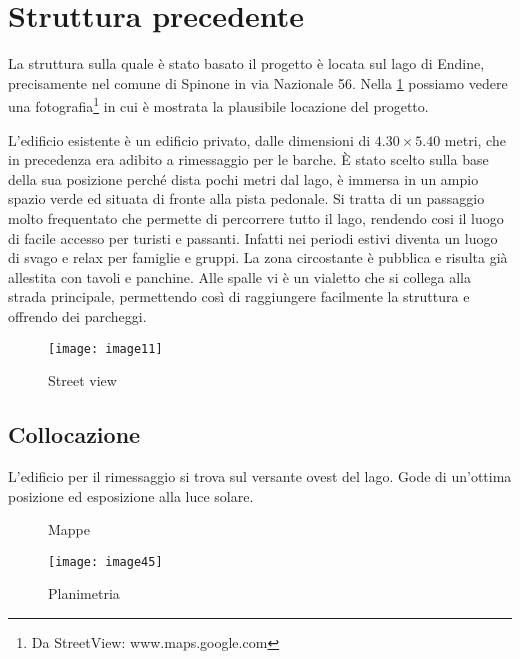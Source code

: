 \section{Struttura precedente}

La struttura sulla quale è stato basato il progetto è locata sul lago di Endine,  precisamente nel comune di Spinone in via Nazionale 56. Nella \cref{fig:streetview} possiamo vedere una fotografia\footnote{Da StreetView: www.maps.google.com} in cui è mostrata la plausibile locazione del progetto.

L'edificio esistente è un edificio privato, dalle dimensioni di $4.30 \times 5.40$ metri, che in precedenza era adibito a rimessaggio per le barche.  È stato scelto sulla base della sua posizione perché dista pochi metri dal lago, è immersa in un ampio spazio verde  ed situata di fronte alla pista pedonale. Si tratta di un passaggio molto frequentato  che permette di percorrere tutto il lago, rendendo cosi il luogo di facile accesso per turisti e passanti. Infatti nei periodi estivi diventa un luogo di svago e relax per famiglie e gruppi. La zona circostante è pubblica e risulta già allestita con tavoli e panchine. Alle spalle vi è un vialetto  che si collega alla strada principale, permettendo così di raggiungere facilmente la struttura e offrendo dei parcheggi.

\begin{figure}[H]
	\centering
	\texttt{[image: image11]}
	\caption{Street view}
	\label{fig:streetview}
\end{figure}

\clearpage
\subsection{Collocazione}

L'edificio per il rimessaggio si trova sul versante ovest del lago. Gode di un'ottima posizione ed esposizione alla luce solare.

\begin{figure}[H]
	\captionsetup[subfloat]{farskip=2pt,captionskip=8pt}
	\centering
	\hspace{1cm}
	
	\caption{Mappe}
	\label{fig:imagesizes}
\end{figure}


\begin{figure}[H]
	\centering
	\texttt{[image: image45]}
	\caption{Planimetria}
	\label{fig:mesh1}
\end{figure}